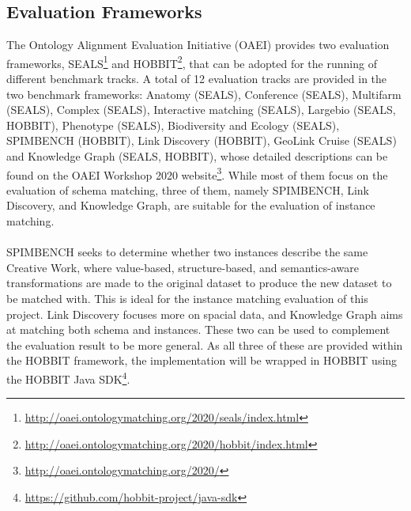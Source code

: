 \subsection{Evaluation Frameworks}

The Ontology Alignment Evaluation Initiative (OAEI) provides two evaluation frameworks, SEALS\footnote{\url{http://oaei.ontologymatching.org/2020/seals/index.html}} and HOBBIT\footnote{\url{http://oaei.ontologymatching.org/2020/hobbit/index.html}}, that can be adopted for the running of different benchmark tracks. A total of 12 evaluation tracks are provided in the two benchmark frameworks: Anatomy (SEALS), Conference (SEALS), Multifarm (SEALS), Complex (SEALS), Interactive matching (SEALS), Largebio (SEALS, HOBBIT), Phenotype (SEALS), Biodiversity and Ecology (SEALS), SPIMBENCH (HOBBIT), Link Discovery (HOBBIT), GeoLink Cruise (SEALS) and Knowledge Graph (SEALS, HOBBIT), whose detailed descriptions can be found on the OAEI Workshop 2020 website\footnote{\url{http://oaei.ontologymatching.org/2020/}}. While most of them focus on the evaluation of schema matching, three of them, namely SPIMBENCH, Link Discovery, and Knowledge Graph, are suitable for the evaluation of instance matching.
\\\\
SPIMBENCH seeks to determine whether two instances describe the same Creative Work, where value-based, structure-based, and semantics-aware transformations are made to the original dataset to produce the new dataset to be matched with. This is ideal for the instance matching evaluation of this project. Link Discovery focuses more on spacial data, and Knowledge Graph aims at matching both schema and instances. These two can be used to complement the evaluation result to be more general. As all three of these are provided within the HOBBIT framework, the implementation will be wrapped in HOBBIT using the HOBBIT Java SDK\footnote{\url{https://github.com/hobbit-project/java-sdk}}.
